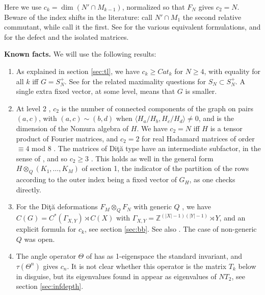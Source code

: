 \documentclass[11pt]{amsart}
\begin{document}
\medskip

\noindent Here we use $c_k=\dim(N'\cap M_{k-1})$, normalized so that $F_N$ gives $c_2=N$. Beware of the index shifts in the literature: \cite{cn} call $N'\cap M_1$ the second relative commutant, while \cite{ben} call it the first. See \cite{jmn,nom,pop} for the various equivalent formulations, and \cite{ba1,mwe,szo,tz2} for the defect and the isolated matrices.

\medskip

\noindent\textbf{Known facts.} We will use the following results:
\begin{enumerate}
\item As explained in section \ref{sec:tl}, we have $c_k\geq Cat_k$ for $N\geq4$, with equality for all $k$ iff $G=S_N^+$. See \cite{bcm} for the related maximality questions for $S_N\subset S_N^+$. A single extra fixed vector, at some level, means that $G$ is smaller.

\item At level 2 \cite{cn,jmn,jon}, $c_2$ is the number of connected components of the graph on pairs $(a,c)$, with $(a,c)\sim(b,d)$ when $\langle H_a/H_b,H_c/H_d\rangle\neq0$, and is the dimension of the Nomura algebra of $H$. We have $c_2=N$ iff $H$ is a tensor product of Fourier matrices, and $c_2=2$ for real Hadamard matrices of order $\equiv4$ mod $8$ \cite{jmn}. The matrices of Di\c t\u a type have an intermediate subfactor, in the sense of \cite{bha,gj}, and so $c_2\geq3$ \cite{cn}. This holds as well in the general form $H\otimes_Q(K_1,\ldots,K_M)$ of section 1, the indicator of the partition of the rows according to the outer index being a fixed vector of $G_H$, as one checks directly.

\item For the Di\c t\u a deformations $F_M\otimes_QF_N$ with generic $Q$ \cite{bb3}, we have $C(G)=C^*(\Gamma_{X,Y})\rtimes C(X)$ with $\Gamma_{X,Y}=\mathbb Z^{(|X|-1)(|Y|-1)}\rtimes Y$, and an explicit formula for $c_k$, see section \ref{sec:bb}. See also \cite{bic,bur}. The case of non-generic $Q$ was open.

\item The angle operator $\Theta$ of \cite{jon,mo1} has as 1-eigenspace the standard invariant, and $\tau(\Theta^n)$ gives $c_n$. It is not clear whether this operator is the matrix $T_k$ below in disguise, but its eigenvalues found in \cite{mo2,mo3} appear as eigenvalues of $NT_2$, see section \ref{sec:infdepth}.
\end{enumerate}
\end{document}
